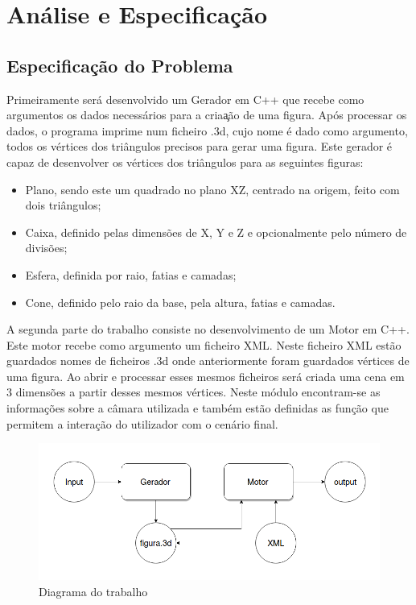 \documentclass{report}
\begin{document}
\chapter{An\'alise e Especifica\c{c}\~{a}o} 
\section{Especifica\c{c}\~{a}o do Problema} %
Primeiramente será desenvolvido um Gerador em C++ que recebe como argumentos os dados necess\'arios para a cria\c{a}\~ao de uma figura. Após processar os dados, o programa imprime num ficheiro .3d, cujo nome \'e dado como argumento, todos os v\'ertices dos tri\^angulos precisos para gerar uma figura. Este gerador é capaz de desenvolver os vértices dos tri\^angulos para as seguintes figuras:
\begin{itemize}
\item Plano, sendo este um quadrado no plano XZ, centrado na origem, feito com dois tri\^angulos;
\item Caixa, definido pelas dimens\~oes de X, Y e Z e opcionalmente pelo n\'umero de divis\~oes;
\item Esfera, definida por raio, fatias e camadas;
\item Cone, definido pelo raio da base, pela altura, fatias e camadas.
\end{itemize}

A segunda parte do trabalho consiste no desenvolvimento de um Motor em C++. Este motor recebe como argumento um ficheiro XML. Neste ficheiro XML est\~ao guardados nomes de ficheiros .3d onde anteriormente foram guardados v\'ertices de uma figura. Ao abrir e processar esses mesmos ficheiros ser\'a criada uma cena em 3 dimens\~oes a partir desses mesmos v\'ertices. Neste m\'odulo encontram-se as informa\c{c}\~oes sobre a c\^amara utilizada e tamb\'em est\~ao definidas as fun\c{c}\~ao que permitem a intera\c{c}\~ao do utilizador com o cen\'ario final.
\begin{figure}[h]
\centering
\includegraphics[scale=0.4]{diagrama.png}
\caption{Diagrama do trabalho}
\end{figure}
\end{document}
